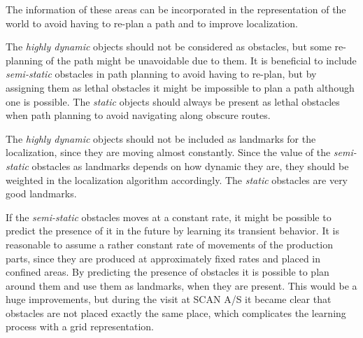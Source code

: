 The information of these areas can be incorporated in the representation of the world to avoid having to re-plan a path and to improve localization. 

The \textit{highly dynamic} objects should not be considered as obstacles, but some re-planning of the path might be unavoidable due to them. 
It is beneficial to include \textit{semi-static} obstacles in path planning to avoid having to re-plan, but by assigning them as lethal obstacles it might be impossible to plan a path although one is possible.
The \textit{static} objects should always be present as lethal obstacles when path planning to avoid navigating along obscure routes.

The \textit{highly dynamic} objects should not be included as landmarks for the localization, since they are moving almost constantly. 
Since the value of the \textit{semi-static} obstacles as landmarks depends on how dynamic they are, they should be weighted in the localization algorithm accordingly. 
The \textit{static} obstacles are very good landmarks.

If the \textit{semi-static} obstacles moves at a constant rate, it might be possible to predict the presence of it in the future by learning its transient behavior.
It is reasonable to assume a rather constant rate of movements of the production parts, since they are produced at approximately fixed rates and placed in confined areas.
By predicting the presence of obstacles it is possible to plan around them and use them as landmarks, when they are present.
This would be a huge improvements, but during the visit at SCAN A/S it became clear that obstacles are not placed exactly the same place, which complicates the learning process with a grid representation.